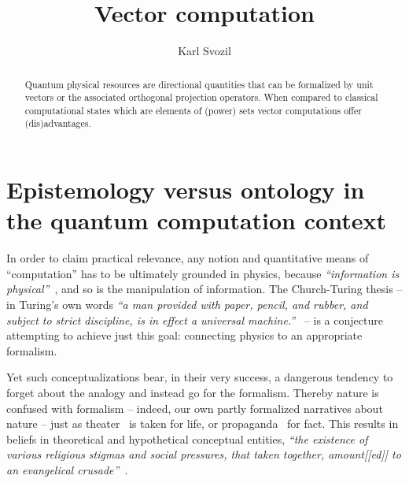 \documentclass{ws-procs9x6}
\begin{document}
\title{Vector computation}

\author{Karl Svozil}

\address{Institute for Theoretical Physics, TU Wien,\\
Wiedner Hauptstrasse 8-10/136, 1040 Vienna,  Austria\\
E-mail: svozil@tuwien.ac.at\\
http://tph.tuwien.ac.at/\string~svozil}

\begin{abstract}
Quantum physical resources are directional quantities that can be formalized by unit vectors or the associated orthogonal projection operators. When compared to classical computational states which are elements of (power) sets vector computations offer (dis)advantages.
\end{abstract}


\bodymatter


\section{Epistemology versus ontology in the quantum computation context}

In order to claim practical relevance,
any notion and quantitative means of ``computation'' has to be ultimately grounded in
physics, because \emph{``information is physical''}~\cite{landauer},
and so is the manipulation of information.
The Church-Turing thesis --
in Turing's own words \emph{``a man
provided with paper, pencil, and rubber, and subject to strict discipline, is in
effect a universal machine.''}~\cite{copeland04turing}
--
is a conjecture attempting to achieve just this goal: connecting physics to an appropriate formalism.

Yet such conceptualizations bear, in their very success, a dangerous tendency
to forget about the analogy and instead go for the formalism.
Thereby nature is confused with formalism -- indeed, our own partly formalized narratives about nature
-- just as theater~\cite{Arthaud-en} is taken for life,
or propaganda~\cite{bernais-propaganda} for fact.
This results in beliefs in theoretical and hypothetical conceptual entities,
\emph{``the existence of various religious stigmas and social pressures, that taken
together, amount[[ed]] to an evangelical crusade''}~\cite{clauser-talkvie}.
\end{document}
